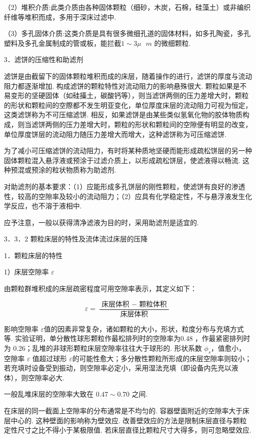 \documentclass[
]{article}
\begin{document}
（2）堆积介质:此类介质由各种固体颗粒（细砂，木炭，石棉，硅藻土）或非编织纤维等堆积而成，多用于深床过滤中. 

（3）多孔固体介质:这类介质是具有很多微细孔道的固体材料，如多孔陶瓷，多孔塑料及多孔金属制成的管或板，能拦截\(1 \sim 3\mu\text{\ }m\) 的微细颗粒. 

3．滤饼的压缩性和助滤剂

滤饼是由截留下的固体颗粒堆积而成的床层，随着操作的进行，滤饼的厚度与流动阻力都逐渐增加. 构成滤饼的颗粒特性对流动阻力的影响悬殊很大. 颗粒如果是不易变形的坚硬固体（如硅㩰土，碳酸钙等），则当滤饼两侧的压力差增大时，颗粒的形状和颗粒间的空際都不发生明亚变化，单位厚度床层的流动阻力可视为恒定，这类滤饼称为不可压缩滤饼. 相反，如果滤饼是由某些类似氢氧化物的胶体物质构成，则当滤饼两侧的压力差增大时，颗粒的形状和颗粒间的空隙便有明显的改变，单位厚度饼层的流动阻力随压力差增大而增大，这种滤饼称为可压缩滤饼. 

为了减小可压缩滤饼的流动阻力，有时将某种质地坚硬而能形成疏松饼层的另一种固体颗粒混入悬浮液或预涂于过滤介质上，以形成疏松饼层，使滤液得以畅流. 这种预混或预涂的粒状物质称为助滤剂. 

对助滤剂的基本要求：（1）应能形成多孔饼层的刚性颗粒，使滤饼有良好的渗透性，较高的空隙率及较小的流动阻力；（2）应具有化学稳定性，不与悬浮液发生化学反应，也不溶于液相中. 

应予注意，一般以获得清净滤液为目的时，采用助滤剂是适宜的. 

3．3．2 颗粒床层的特性及流体流过床层的压降

1．颗粒床层的特性

1）床层空隙率 \(\varepsilon\)

由颗粒群堆积成的床层疏密程度可用空隙率表示，其定义如下：

\[\varepsilon = \frac{\text{~床层体积~} - \text{~颗粒体积~}}{\text{~床层体积~}}\]

影响空隙率 \(\varepsilon\)值的因素非常复杂，诸如颗粒的大小，形状，粒度分布与充填方式等. 实验证明，单分散性球形颗粒作最松排列时的空隙率为0.48 ，作最紧密排列时为 0.26；乱堆的非球形颗粒床层空隙率往往大于球形的. 形状系数 \(\phi_s\)，值愈小，空隙率 \(\varepsilon\) 值超过球形 \(\varepsilon\)的可能性愈大；多分散性颗粒所形成的床层空隙率则较小；若充填时设备受到振动，则空隙率必定小，采用湿法充填（即设备内先充以液体），则空隙率必大. 

一般乱堆床层的空隙率大致在 \(0.47 \sim 0.70\) 之间. 

在床层的同一截面上空隙率的分布通常是不均匀的. 容器壁面附近的空隙率大于床层中心的. 这种壁面的影响称为壁效应. 改善壁效应的方法是限制床层直径与颗粒定性尺寸之比不得小于某极限值. 若床层直径比颗粒尺寸大得多，则可忽略壁效应. 
\end{document}
